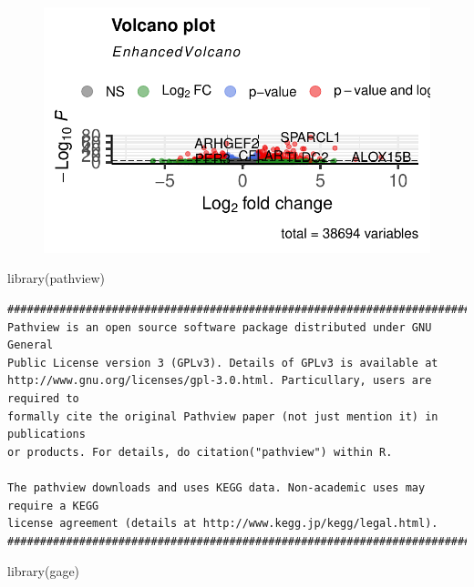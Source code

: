 \documentclass[
  letterpaper,
  DIV=11,
  numbers=noendperiod]{scrartcl}
\newenvironment{Shaded}{\begin{snugshade}}{\end{snugshade}}
\newcommand{\FunctionTok}[1]{\textcolor[rgb]{0.28,0.35,0.67}{#1}}
\newcommand{\NormalTok}[1]{\textcolor[rgb]{0.00,0.23,0.31}{#1}}
\begin{document}
\begin{figure}[H]

{\centering \includegraphics{12writeup_files/figure-pdf/unnamed-chunk-33-1.pdf}

}

\end{figure}

\begin{Shaded}
\begin{Highlighting}[]
\FunctionTok{library}\NormalTok{(pathview)}
\end{Highlighting}
\end{Shaded}

\begin{verbatim}
##############################################################################
Pathview is an open source software package distributed under GNU General
Public License version 3 (GPLv3). Details of GPLv3 is available at
http://www.gnu.org/licenses/gpl-3.0.html. Particullary, users are required to
formally cite the original Pathview paper (not just mention it) in publications
or products. For details, do citation("pathview") within R.

The pathview downloads and uses KEGG data. Non-academic uses may require a KEGG
license agreement (details at http://www.kegg.jp/kegg/legal.html).
##############################################################################
\end{verbatim}

\begin{Shaded}
\begin{Highlighting}[]
\FunctionTok{library}\NormalTok{(gage)}
\end{Highlighting}
\end{Shaded}
\end{document}
